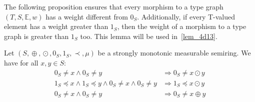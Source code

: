 
The following proposition ensures that every morphism to a type graph $(T,S,\mathbb{E}, w)$ has a weight different from $0_S$. Additionally, if every T-valued element has a weight greater than $1_S$, then the weight of a morphism to a type graph is greater than $1_S$ too. This lemma will be used in~\autoref{lem_4d13}.
\begin{proposition}  
    \label{prop_endrullis_2d7}
    Let $(S, \mathop{\oplus}, \mathop{\odot}, 0_S, 1_S, \prec, \mu)$ be a strongly monotonic measurable semiring. We have for all $x,y\in S$:
    \begin{align*}
        0_S \mathop{\neq} x \mathop{\land} 0_S \mathop{\neq} y 
        &\mathop{\Rightarrow} 0_S \mathop{\neq} x \mathop{\odot} y 
        \tag{S10} \label{eq:prop_neq0_mul_neq0}  
        \\
        1_S \mathop{\preceq} x \mathop{\land} 1_S \mathop{\preceq} y \mathop{\land} 0_S \mathop{\neq} x \mathop{\land} 0_S \mathop{\neq} y  
        &\mathop{\Rightarrow}
         1_S \mathop{\preceq} x \mathop{\odot} y 
         \tag{S11} \label{eq:prop_neg0_ge1_mul_ge1}  
         \\
         0_S \mathop{\neq} x \mathop{\land} 0_S \mathop{\neq} y   
         &\mathop{\Rightarrow} 0_S \mathop{\neq} x \mathop{\oplus} y
         \tag{S12} \label{eq:prop_neq0_plus_neq0}  
    \end{align*}
\end{proposition}

